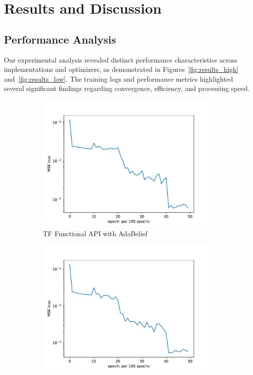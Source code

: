 \documentclass[10pt,journal,compsoc,onecolumn]{IEEEtran}
\begin{document}
\section{Results and Discussion}\label{sec:discussion}
\subsection{Performance Analysis}
Our experimental analysis revealed distinct performance characteristics across implementations and optimizers, as demonstrated in Figures~\ref{fig:results_high} and~\ref{fig:results_low}. The training logs and performance metrics highlighted several significant findings regarding convergence, efficiency, and processing speed.

\begin{figure}[htbp]
    \centering
    \begin{subfigure}[b]{0.45\textwidth}
        \includegraphics[width=\textwidth]{../../results/functional/high-frequency-adabelief-20250206-1520-5/loss}
        \caption{TF Functional API with AdaBelief}
    \end{subfigure}
    \begin{subfigure}[b]{0.45\textwidth}
        \includegraphics[width=\textwidth]{../../results/functional/high-frequency-adam-20250206-1520-1/loss}

\end{subfigure}
\end{figure}
\end{document}
